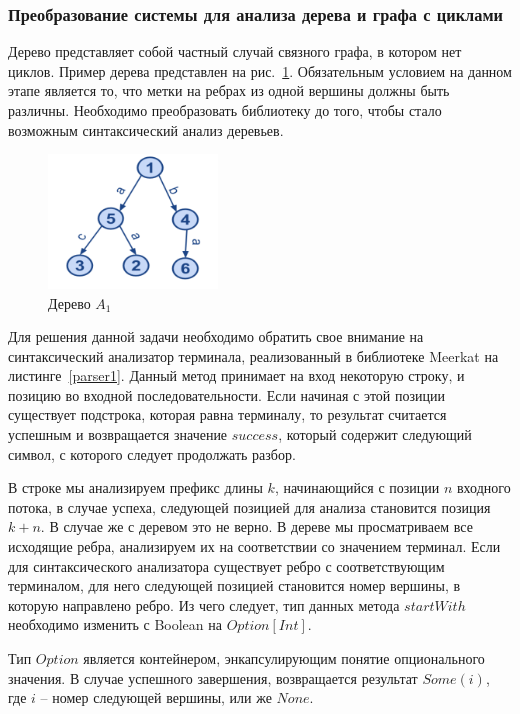 \subsubsection{Преобразование системы для анализа дерева и графа с циклами}


Дерево представляет собой частный случай связного графа, в котором нет циклов. Пример дерева представлен на рис.~\ref{Graph1}. Обязательным условием на данном этапе является то, что метки на ребрах из одной вершины должны быть различны. Необходимо преобразовать библиотеку до того, чтобы стало возможным синтаксический анализ деревьев.

\begin{figure}

 \centering
 \includegraphics[width=0.4\textwidth]{Smolina/pics/Graph1.png}
 \caption{Дерево $A_1$}
 \label{Graph1}
\end{figure}

Для решения данной задачи необходимо обратить свое внимание на синтаксический анализатор терминала, реализованный в библиотеке Meerkat на листинге~\ref{parser1}. Данный метод принимает на вход некоторую строку, и позицию во входной последовательности. Если начиная с этой позиции существует подстрока, которая равна терминалу, то результат считается успешным и возвращается значение $success$, который содержит следующий символ, с которого следует продолжать разбор. 

В строке мы анализируем префикс длины $k$, начинающийся с позиции $n$ входного потока, в случае успеха, следующей позицией для анализа становится позиция $k+n$. В случае же с деревом это не верно. В дереве мы просматриваем все исходящие ребра, анализируем их на соответствии со значением терминал. Если для синтаксического анализатора существует ребро с соответствующим терминалом, для него следующей позицией становится номер вершины, в которую направлено ребро. Из чего следует, тип данных метода $startWith$ необходимо изменить с Boolean на $Option[Int]$.

Тип $Option$ является контейнером, энкапсулирующим понятие опционального значения. В случае успешного завершения, возвращается результат $Some(i)$, где $i$ – номер следующей вершины, или же $None$.

